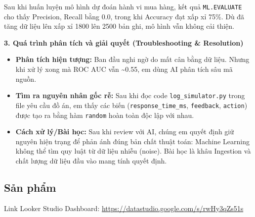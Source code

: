 Sau khi huấn luyện mô hình dự đoán hành vi mua hàng, kết quả \texttt{ML.EVALUATE} cho thấy Precision, Recall bằng 0.0, trong khi Accuracy đạt xấp xỉ 75\%. Dù đã tăng dữ liệu lên xấp xỉ 1800 lên 2500 bản ghi, mô hình vẫn không cải thiện.

\textbf{3. Quá trình phân tích và giải quyết (Troubleshooting \& Resolution)}

\begin{itemize}
    \item \textbf{Phân tích hiện tượng:} Ban đầu nghi ngờ do mất cân bằng dữ liệu. Nhưng khi xử lý xong mà ROC AUC vẫn \textasciitilde 0.55, em dùng AI phân tích sâu mã nguồn.
    \item \textbf{Tìm ra nguyên nhân gốc rễ:} Sau khi đọc code \texttt{log\_simulator.py} trong file yêu cầu đồ án, em thấy các biến (\texttt{response\_time\_ms}, \texttt{feedback}, \texttt{action}) được tạo ra bằng hàm \texttt{random} hoàn toàn độc lập với nhau.
    \item \textbf{Cách xử lý/Bài học:} Sau khi review với AI, chúng em quyết định giữ nguyên hiện trạng để phản ánh đúng bản chất thuật toán: Machine Learning không thể tìm quy luật từ dữ liệu nhiễu (noise). Bài học là khâu Ingestion và chất lượng dữ liệu đầu vào mang tính quyết định.
\end{itemize}

\subsection{Sản phẩm}
Link Looker Studio Dashboard: \url{https://datastudio.google.com/s/rwHy3qZs51s}